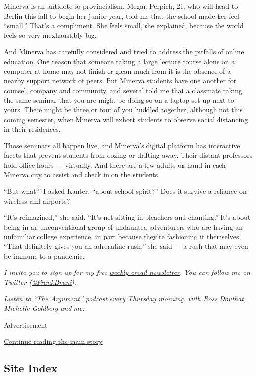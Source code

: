 Minerva is an antidote to provincialism. Megan Perpich, 21, who will
head to Berlin this fall to begin her junior year, told me that the
school made her feel ``small.'' That's a compliment. She feels small,
she explained, because the world feels so very inexhaustibly big.

And Minerva has carefully considered and tried to address the pitfalls
of online education. One reason that someone taking a large lecture
course alone on a computer at home may not finish or glean much from it
is the absence of a nearby support network of peers. But Minerva
students have one another for counsel, company and community, and
several told me that a classmate taking the same seminar that you are
might be doing so on a laptop set up next to yours. There might be three
or four of you huddled together, although not this coming semester, when
Minerva will exhort students to observe social distancing in their
residences.

Those seminars all happen live, and Minerva's digital platform has
interactive facets that prevent students from dozing or drifting away.
Their distant professors hold office hours --- virtually. And there are
a few adults on hand in each Minerva city to assist and check in on the
students.

``But what,'' I asked Kanter, ``about school spirit?'' Does it survive a
reliance on wireless and airports?

``It's reimagined,'' she said. ``It's not sitting in bleachers and
chanting.'' It's about being in an unconventional group of undaunted
adventurers who are having an unfamiliar college experience, in part
because they're fashioning it themselves. ``That definitely gives you an
adrenaline rush,'' she said --- a rush that may even be immune to a
pandemic.

\emph{I invite you to sign up for my free}
\href{https://www.nytimes3xbfgragh.onion/newsletters/frank-bruni}{\emph{weekly
email newsletter}}\emph{. You can follow me on Twitter
(}\href{https://twitter.com/FrankBruni}{\emph{@FrankBruni}}\emph{).}

\emph{Listen to}
\href{https://www.nytimes3xbfgragh.onion/column/the-argument}{\emph{``The
Argument'' podcast}} \emph{every Thursday morning, with Ross Douthat,
Michelle Goldberg and me.}

Advertisement

\protect\hyperlink{after-bottom}{Continue reading the main story}

\hypertarget{site-index}{%
\subsection{Site Index}\label{site-index}}

